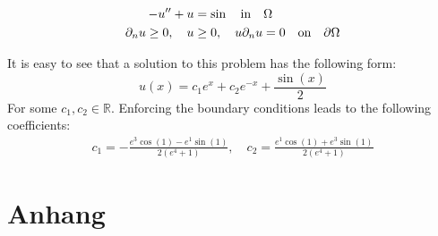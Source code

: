 \documentclass[headsepline,footsepline,footinclude=false,oneside,fontsize=11pt,paper=a4,listof=totoc,bibliography=totoc]{scrbook} %
\begin{document}
\begin{align*}
-u'' + u &= \sin \quad \textnormal{in} \quad \Omega \\ 
\partial_n u \geq 0,\quad u &\geq 0,\quad u\partial_nu = 0 \quad\textnormal{on}\quad \partial \Omega 
\end{align*}

It is easy to see that a solution to this problem has the following form:
\begin{equation*}
	u(x) = c_1 e^x + c_2 e^{-x} + \frac{\sin(x)}{2}
\end{equation*}
For some $c_1,c_2 \in \mathbb{R}$. Enforcing the boundary conditions leads to the following coefficients:
\begin{align*}
c_1 = - \frac{e^3\cos(1) - e^1\sin(1)}{2(e^4 + 1)}, \quad c_2 = \frac{e^1\cos(1) + e^3\sin(1)}{2(e^4 + 1)}
\end{align*}



\chapter{Anhang}

\printbibliography{}
\end{document}

